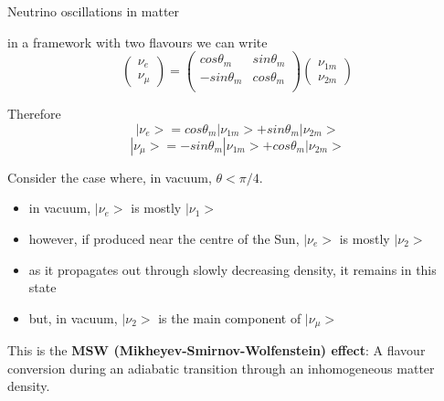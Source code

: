 \begin{frame}{Neutrino oscillations in matter}

  in a framework with two flavours we can write
  \begin{equation}
   \nonumber
   \begin{pmatrix}
    \nu_{e}\\ \nu_{\mu}
   \end{pmatrix}
   =
   \begin{pmatrix}
     cos\theta_m & sin\theta_m \\
    -sin\theta_m & cos\theta_m \\
   \end{pmatrix}
   \begin{pmatrix}
    \nu_{1m}\\ \nu_{2m}
   \end{pmatrix}
  \end{equation}

  Therefore
  \begin{equation}
    \nonumber
    |\nu_{e}> = cos\theta_m |\nu_{1m}> + sin\theta_m |\nu_{2m}>
  \end{equation}
  \begin{equation}
    \nonumber
    |\nu_{\mu}> = -sin\theta_m |\nu_{1m}> + cos\theta_m |\nu_{2m}>
  \end{equation}

  Consider the case where, in vacuum, $\theta < \pi/4$.
  \begin{itemize}
    \item in vacuum, $|\nu_{e}>$ is mostly $|\nu_{1}>$
    \item however, if produced near the centre of the Sun, $|\nu_{e}>$ is mostly $|\nu_{2}>$
    \item as it propagates out through slowly decreasing density, it remains in this state
    \item but, in vacuum, $|\nu_{2}>$ is the main component of $|\nu_{\mu}>$
  \end{itemize}
  This is the {\bf MSW (Mikheyev-Smirnov-Wolfenstein) effect}:
  A flavour conversion during an adiabatic transition through an inhomogeneous matter density.
\end{frame}

%
%
%

